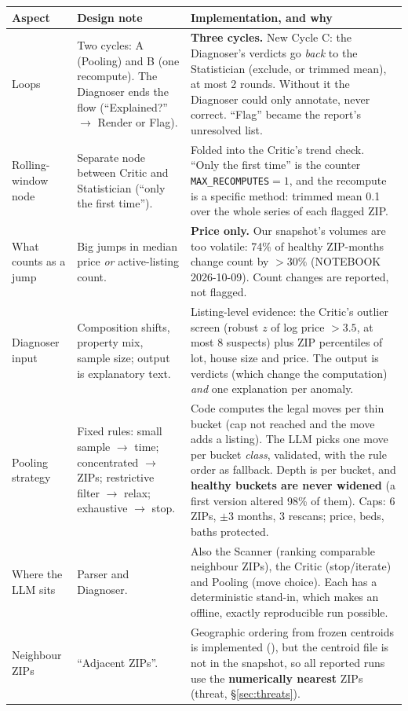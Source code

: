 \documentclass[11pt,a4paper]{article}
\newcommand{\file}[1]{\texttt{\detokenize{#1}}}
\begin{document}
\begin{table}[h]
\centering\small
\begin{tabularx}{\textwidth}{@{}L{2.5cm}XX@{}}
\toprule
Aspect & Design note & Implementation, and why \\
\midrule
Loops & Two cycles: A (Pooling) and B (one recompute). The Diagnoser ends the flow (``Explained?'' $\rightarrow$ Render or Flag). & \textbf{Three cycles.} New Cycle C: the Diagnoser's verdicts go \emph{back} to the Statistician (exclude, or trimmed mean), at most 2 rounds. Without it the Diagnoser could only annotate, never correct. ``Flag'' became the report's unresolved list. \\
Rolling-window node & Separate node between Critic and Statistician (``only the first time''). & Folded into the Critic's trend check. ``Only the first time'' is the counter \texttt{MAX\_RECOMPUTES}$=1$, and the recompute is a specific method: trimmed mean 0.1 over the whole series of each flagged ZIP. \\
What counts as a jump & Big jumps in median price \emph{or} active-listing count. & \textbf{Price only.} Our snapshot's volumes are too volatile: 74\% of healthy ZIP-months change count by $>30\%$ (NOTEBOOK 2026-10-09). Count changes are reported, not flagged. \\
Diagnoser input & Composition shifts, property mix, sample size; output is explanatory text. & Listing-level evidence: the Critic's outlier screen (robust $z$ of log price $>3.5$, at most 8 suspects) plus ZIP percentiles of lot, house size and price. The output is verdicts (which change the computation) \emph{and} one explanation per anomaly. \\
Pooling strategy & Fixed rules: small sample $\rightarrow$ time; concentrated $\rightarrow$ ZIPs; restrictive filter $\rightarrow$ relax; exhaustive $\rightarrow$ stop. & Code computes the legal moves per thin bucket (cap not reached and the move adds a listing). The LLM picks one move per bucket \emph{class}, validated, with the rule order as fallback. Depth is per bucket, and \textbf{healthy buckets are never widened} (a first version altered 98\% of them). Caps: 6 ZIPs, $\pm3$ months, 3 rescans; price, beds, baths protected. \\
Where the LLM sits & Parser and Diagnoser. & Also the Scanner (ranking comparable neighbour ZIPs), the Critic (stop/iterate) and Pooling (move choice). Each has a deterministic stand-in, which makes an offline, exactly reproducible run possible. \\
Neighbour ZIPs & ``Adjacent ZIPs''. & Geographic ordering from frozen centroids is implemented (\file{housing_trends/geo.py}), but the centroid file is not in the snapshot, so all reported runs use the \textbf{numerically nearest} ZIPs (threat, \S\ref{sec:threats}). \\

\end{tabularx}
\end{table}
\end{document}
